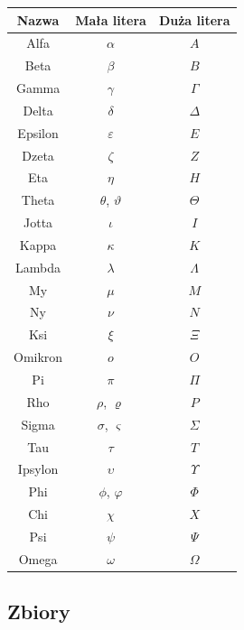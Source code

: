 \documentclass[14pt,a4paper]{extarticle}
\begin{document}
\begin{multicols}{2}
{
\begin{tabular}{|>{}c*{2}{|c}|}
\hline
{}Nazwa & Mała litera & Duża litera \\
\hline
Alfa & $\alpha $ & $A $ \\ 
Beta & $\beta $ & $B $ \\
Gamma & $\gamma $ & $\Gamma $ \\
Delta & $\delta $ & $\Delta $ \\
Epsilon & $\varepsilon $ & $E $ \\
Dzeta & $\zeta $ & $Z $ \\
Eta & $\eta $ & $H $ \\
Theta & $\theta$, $\vartheta $ & $\Theta $ \\
Jotta & $\iota $ & $I $ \\
Kappa & $\kappa $ & $K $ \\
Lambda & $\lambda $ & $\Lambda $ \\
My & $\mu $ & $M $ \\
Ny & $\nu $ & $N $ \\
Ksi & $\xi $ & $\Xi $ \\
Omikron & $o $ & $O $ \\
Pi & $\pi $ & $\Pi $ \\
Rho & $\rho$, $\varrho$ & $P $ \\
Sigma & $\sigma$, $\varsigma$ & $\Sigma $ \\
Tau & $\tau $ & $T $ \\
Ipsylon & $\upsilon $ & $\Upsilon $ \\
Phi & $\phi$, $\varphi $ & $\Phi $ \\
Chi & $\chi $ & $X $ \\
Psi & $\psi $ & $\Psi $ \\
Omega & $\omega $ & $\Omega $ \\
\hline
\end{tabular}
}%

\subsection{Zbiory}


{%

}
\end{multicols}
\end{document}
